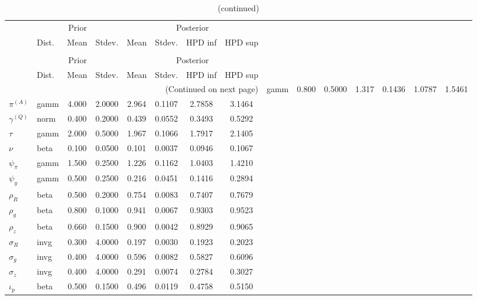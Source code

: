  
\begin{center}
\begin{longtable}{llcccccc} 
\caption{Results from Metropolis-Hastings (parameters)}
 \label{Table:MHPosterior:1}\\
\toprule 
  & \multicolumn{3}{c}{Prior}  &  \multicolumn{4}{c}{Posterior} \\
  \cmidrule(r{.75em}){2-4} \cmidrule(r{.75em}){5-8}
  & Dist. & Mean  & Stdev. & Mean & Stdev. & HPD inf & HPD sup\\
\midrule \endfirsthead 
\caption{(continued)}\\\toprule 
  & \multicolumn{3}{c}{Prior}  &  \multicolumn{4}{c}{Posterior} \\
  \cmidrule(r{.75em}){2-4} \cmidrule(r{.75em}){5-8}
  & Dist. & Mean  & Stdev. & Mean & Stdev. & HPD inf & HPD sup\\
\midrule \endhead 
\bottomrule \multicolumn{8}{r}{(Continued on next page)} \endfoot 
\bottomrule \endlastfoot 
${r_{A}}$ & gamm &   0.800 & 0.5000 &   1.317& 0.1436 &  1.0787 &  1.5461 \\ 
${\pi^{(A)}}$ & gamm &   4.000 & 2.0000 &   2.964& 0.1107 &  2.7858 &  3.1464 \\ 
${\gamma^{(Q)}}$ & norm &   0.400 & 0.2000 &   0.439& 0.0552 &  0.3493 &  0.5292 \\ 
${\tau}$ & gamm &   2.000 & 0.5000 &   1.967& 0.1066 &  1.7917 &  2.1405 \\ 
${\nu}$ & beta &   0.100 & 0.0500 &   0.101& 0.0037 &  0.0946 &  0.1067 \\ 
${\psi_\pi}$ & gamm &   1.500 & 0.2500 &   1.226& 0.1162 &  1.0403 &  1.4210 \\ 
${\psi_y}$ & gamm &   0.500 & 0.2500 &   0.216& 0.0451 &  0.1416 &  0.2894 \\ 
${\rho_R}$ & beta &   0.500 & 0.2000 &   0.754& 0.0083 &  0.7407 &  0.7679 \\ 
${\rho_{g}}$ & beta &   0.800 & 0.1000 &   0.941& 0.0067 &  0.9303 &  0.9523 \\ 
${\rho_z}$ & beta &   0.660 & 0.1500 &   0.900& 0.0042 &  0.8929 &  0.9065 \\ 
${\sigma_R}$ & invg &   0.300 & 4.0000 &   0.197& 0.0030 &  0.1923 &  0.2023 \\ 
${\sigma_{g}}$ & invg &   0.400 & 4.0000 &   0.596& 0.0082 &  0.5827 &  0.6096 \\ 
${\sigma_z}$ & invg &   0.400 & 4.0000 &   0.291& 0.0074 &  0.2784 &  0.3027 \\ 
${\iota_p}$ & beta &   0.500 & 0.1500 &   0.496& 0.0119 &  0.4758 &  0.5150 \\ 
\end{longtable}
 \end{center}
